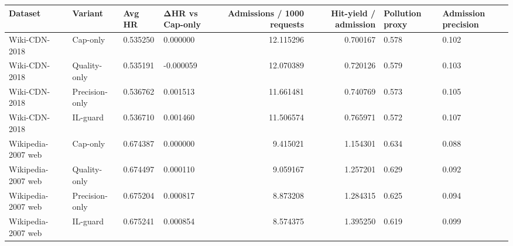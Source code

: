 \begin{tabular}{llllrrll}
\toprule
Dataset & Variant & Avg HR & ΔHR vs Cap-only & Admissions / 1000 requests & Hit-yield / admission & Pollution proxy & Admission precision \\
\midrule
Wiki-CDN-2018 & Cap-only & 0.535250 & 0.000000 & 12.115296 & 0.700167 & 0.578 & 0.102 \\
Wiki-CDN-2018 & Quality-only & 0.535191 & -0.000059 & 12.070389 & 0.720126 & 0.579 & 0.103 \\
Wiki-CDN-2018 & Precision-only & 0.536762 & 0.001513 & 11.661481 & 0.740769 & 0.573 & 0.105 \\
Wiki-CDN-2018 & IL-guard & 0.536710 & 0.001460 & 11.506574 & 0.765971 & 0.572 & 0.107 \\
Wikipedia-2007 web & Cap-only & 0.674387 & 0.000000 & 9.415021 & 1.154301 & 0.634 & 0.088 \\
Wikipedia-2007 web & Quality-only & 0.674497 & 0.000110 & 9.059167 & 1.257201 & 0.629 & 0.092 \\
Wikipedia-2007 web & Precision-only & 0.675204 & 0.000817 & 8.873208 & 1.284315 & 0.625 & 0.094 \\
Wikipedia-2007 web & IL-guard & 0.675241 & 0.000854 & 8.574375 & 1.395250 & 0.619 & 0.099 \\
\bottomrule
\end{tabular}

